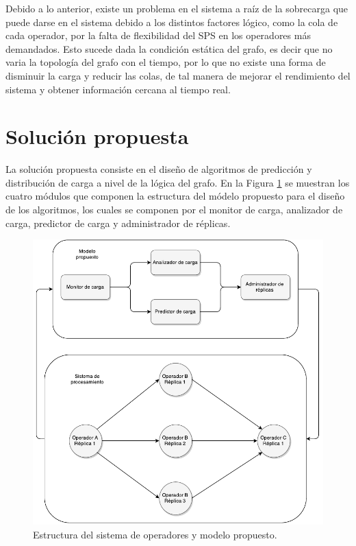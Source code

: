 Debido a lo anterior, existe un problema en el sistema a raíz de la sobrecarga que puede darse en el sistema debido a los distintos factores lógico, como la cola de cada operador, por la falta de flexibilidad del SPS en los operadores más demandados. Esto sucede dada la condición estática del grafo, es decir que no varia la topología del grafo con el tiempo, por lo que no existe una forma de disminuir la carga y reducir las colas, de tal manera de mejorar el rendimiento del sistema y obtener información cercana al tiempo real.

\section{Solución propuesta}
\label{intro:solucion}

La solución propuesta consiste en el dise\~no de algoritmos de predicci\'on y distribuci\'on de carga a nivel de la l\'ogica del grafo. En la Figura \ref{fig:opt} se muestran los cuatro módulos que componen la estructura del m\'odelo propuesto para el dise\~no de los algoritmos, los cuales se componen por el monitor de carga, analizador de carga, predictor de carga y administrador de réplicas.

\begin{figure}[hb!]
  \centering
    \includegraphics[scale=0.9]{images/Diagrama.pdf}
  \caption{Estructura del sistema de operadores y modelo propuesto.}
  \label{fig:opt}
\end{figure}

